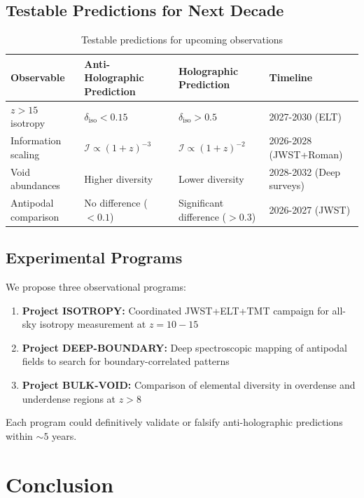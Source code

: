 \documentclass[twocolumn,aps,prd,superscriptaddress,nofootinbib]{revtex4-2}
\begin{document}
\subsection{Testable Predictions for Next Decade}

\begin{table}[t]
\centering
\caption{Testable predictions for upcoming observations}
\label{tab:predictions}
\begin{tabular}{p{4cm}p{5cm}p{4cm}p{3cm}}
\toprule
\textbf{Observable} & \textbf{Anti-Holographic Prediction} & \textbf{Holographic Prediction} & \textbf{Timeline} \\
\midrule
$z > 15$ isotropy & $\delta_{\text{iso}} < 0.15$ & $\delta_{\text{iso}} > 0.5$ & 2027-2030 (ELT) \\
Information scaling & $\mathcal{I} \propto (1+z)^{-3}$ & $\mathcal{I} \propto (1+z)^{-2}$ & 2026-2028 (JWST+Roman) \\
Void abundances & Higher diversity & Lower diversity & 2028-2032 (Deep surveys) \\
Antipodal comparison & No difference ($< 0.1$) & Significant difference ($> 0.3$) & 2026-2027 (JWST) \\
\bottomrule
\end{tabular}
\end{table}

\subsection{Experimental Programs}

We propose three observational programs:

\begin{enumerate}
    \item \textbf{Project ISOTROPY:} Coordinated JWST+ELT+TMT campaign for all-sky isotropy measurement at $z = 10-15$
    
    \item \textbf{Project DEEP-BOUNDARY:} Deep spectroscopic mapping of antipodal fields to search for boundary-correlated patterns
    
    \item \textbf{Project BULK-VOID:} Comparison of elemental diversity in overdense and underdense regions at $z > 8$
\end{enumerate}

Each program could definitively validate or falsify anti-holographic predictions within $\sim 5$ years.

\section{Conclusion}
\end{document}
